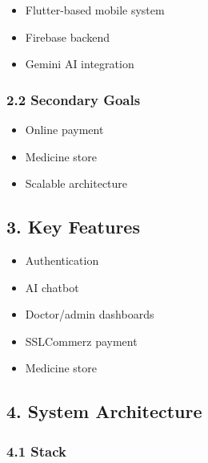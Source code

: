 \documentclass[
]{article}
\providecommand{\tightlist}{%
  \setlength{\itemsep}{0pt}\setlength{\parskip}{0pt}}
\begin{document}
\begin{itemize}
\tightlist
\item
  Flutter-based mobile system\\
\item
  Firebase backend\\
\item
  Gemini AI integration
\end{itemize}

\hypertarget{secondary-goals}{%
\subsubsection{2.2 Secondary Goals}\label{secondary-goals}}

\begin{itemize}
\tightlist
\item
  Online payment\\
\item
  Medicine store\\
\item
  Scalable architecture
\end{itemize}

\hypertarget{key-features}{%
\subsection{3. Key Features}\label{key-features}}

\begin{itemize}
\tightlist
\item
  Authentication\\
\item
  AI chatbot\\
\item
  Doctor/admin dashboards\\
\item
  SSLCommerz payment\\
\item
  Medicine store
\end{itemize}

\hypertarget{system-architecture}{%
\subsection{4. System Architecture}\label{system-architecture}}

\hypertarget{stack}{%
\subsubsection{4.1 Stack}\label{stack}}
\end{document}
